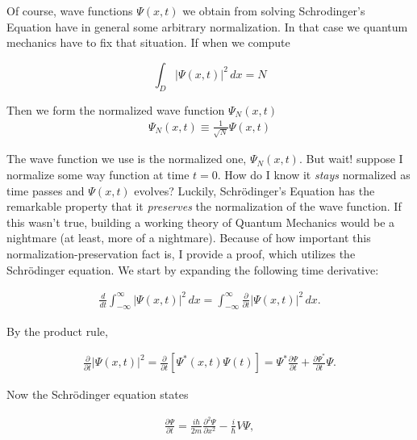 Of course, wave functions $\Psi(x, t)$ we obtain from solving Schrodinger's
Equation have in general some arbitrary normalization. In that case we quantum
mechanics have to fix that situation. If when we compute 

\[
\int_D |\Psi(x, t)|^2 \, dx = N
\] \vspace{3px}

Then we form the normalized wave function $\Psi_N(x, t)$ 
\begin{align} \label{eq:normalized wave function}
  \Psi_N(x, t) \equiv \frac{1}{\sqrt{N}} \Psi(x, t)
\end{align}

The wave function we use is the normalized one, $\Psi_N(x, t)$. But wait!
suppose I normalize some way function at time $t=0$. How do I know it
\textit{stays} normalized as time passes and $\Psi(x, t)$ evolves? Luckily,
Schr\"odinger's Equation has the remarkable property that it \textit{preserves}
the normalization of the wave function. If this wasn't true, building a working
theory of Quantum Mechanics would be a nightmare (at least, more of
a nightmare). Because of how important this normalization-preservation fact is,
I provide a proof, which utilizes the Schr\"odinger equation. We start by
expanding the following time derivative: 

\begin{align} \label{eq:normproof1}
  \frac{d }{d t} \int_{-\infty}^{\infty} |\Psi(x, t)|^2 \, dx
  = \int_{-\infty}^{\infty} \frac{\partial }{\partial t} |\Psi(x, t)|^2 \, dx.        
\end{align}\vspace{3px}

By the product rule, 

\begin{align} \label{eq:normproof2}
  \frac{\partial }{\partial t} |\Psi(x, t)|^2 = \frac{\partial }{\partial t}
  [\Psi^*(x, t)\Psi(t)]= \Psi^* \frac{\partial \Psi}{\partial t}
  + \frac{\partial \Psi^*}{\partial t} \Psi.
\end{align}\vspace{3px}

Now the Schr\"odinger equation states 

\begin{align} \label{eq:normproof3}
\frac{\partial \Psi}{\partial t} = \frac{i\hbar}{2m} \frac{\partial^2
\Psi}{\partial x^2} - \frac{i}{\hbar}V\Psi,    
\end{align}\vspace{3px}

